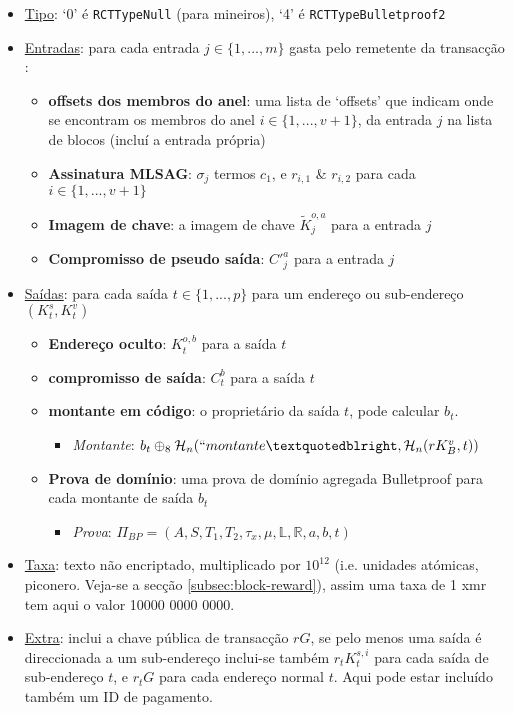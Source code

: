 \begin{itemize}
    \item \underline{Tipo}: `0' é {\tt RCTTypeNull} (para mineiros), `4' é {\tt RCTTypeBulletproof2} %
    \item \underline{Entradas}: para cada entrada $j \in \{1,...,m\}$ gasta pelo remetente da transacção :
    \begin{itemize}
        \item \textbf{offsets dos membros do anel}: uma lista de `offsets' que indicam onde se encontram os membros do anel $i \in \{1,...,v+1\}$, da entrada $j$  na lista de blocos (incluí a entrada própria)
        \item \textbf{Assinatura MLSAG}: $\sigma_j$ termos $c_1$, e $r_{i,1}$ \& $r_{i,2}$ para cada $i \in \{1,...,v+1\}$
        \item \textbf{Imagem de chave}: a imagem de chave $\tilde{K}^{o,a}_j$ para a entrada $j$
        \item \textbf{Compromisso de pseudo saída}: $C'^{a}_j$ para a entrada $j$
    \end{itemize}
    
    \item \underline{Saídas}: para cada saída $t \in \{1,...,p\}$ para um endereço ou sub-endereço $(K^s_t, K^v_t)$
    \begin{itemize}
        \item \textbf{Endereço oculto}: $K^{o,b}_t$ para a saída $t$
        \item \textbf{compromisso de saída}: $C^{b}_t$ para a saída $t$
        \item \textbf{montante em código}: o proprietário da saída $t$, pode calcular $b_t$.
        \begin{itemize}
            \item \textit{Montante}: $b_t \oplus_8 \mathcal{H}_n(``montante”, \mathcal{H}_n(r K_B^v, t))$
        \end{itemize}
        \item \textbf{Prova de domínio}: uma prova de domínio agregada Bulletproof para cada montante de saída $b_t$
        \begin{itemize}
            \item \textit{Prova}: $\Pi_{BP} = (A, S, T_1, T_2, \tau_x, \mu, \mathbb{L}, \mathbb{R}, a, b, t)$
        \end{itemize}
    \end{itemize}
    \item \underline{Taxa}: texto não encriptado, multiplicado por $10^{12}$ (i.e. unidades atómicas, piconero. Veja-se a secção \ref{subsec:block-reward}), assim uma taxa de 1 xmr tem aqui o valor 10000 0000 0000.
    \item \underline{Extra}: inclui a chave pública de transacção $r G$, se pelo menos uma saída é direccionada a um sub-endereço inclui-se também $r_t K^{s,i}_t$ para cada saída de sub-endereço $t$, e $r_t G$ para cada endereço normal $t$. Aqui pode estar incluído também um ID de pagamento.


\end{itemize}
